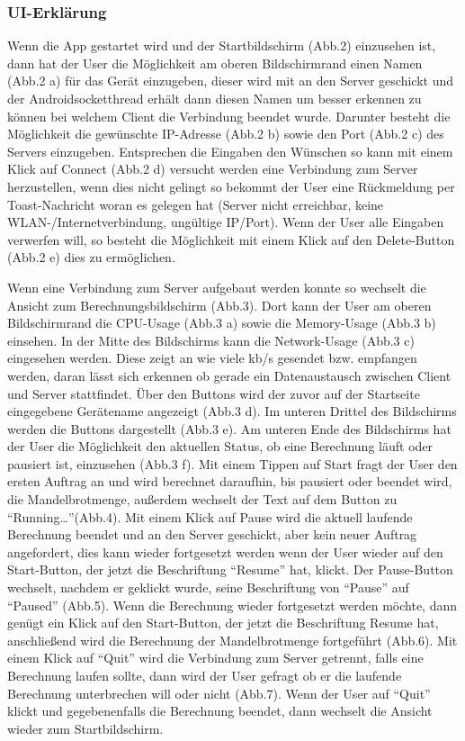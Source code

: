 \documentclass[12pt, onecolumn, notitlepage]{scrartcl}
\begin{document}
\subsubsection{UI-Erklärung}
Wenn die App gestartet wird und der Startbildschirm (Abb.2) einzusehen ist, dann hat der User die Möglichkeit am oberen Bildschirmrand einen Namen (Abb.2 a) für das Gerät einzugeben, dieser wird mit an den Server geschickt und der Androidsocketthread erhält dann diesen Namen um besser erkennen zu können bei welchem Client die Verbindung beendet wurde. Darunter besteht die Möglichkeit die gewünschte IP-Adresse (Abb.2 b) sowie den Port (Abb.2 c) des Servers einzugeben. Entsprechen die Eingaben den Wünschen so kann mit einem Klick auf Connect (Abb.2 d) versucht werden eine Verbindung zum Server herzustellen, wenn dies nicht gelingt so bekommt der User eine Rückmeldung per Toast-Nachricht woran es gelegen hat (Server nicht erreichbar, keine WLAN-/Internetverbindung, ungültige IP/Port). Wenn der User alle Eingaben verwerfen will, so besteht die Möglichkeit mit einem Klick auf den Delete-Button (Abb.2 e) dies zu ermöglichen. \par
Wenn eine Verbindung zum Server aufgebaut werden konnte so wechselt die Ansicht zum Berechnungsbildschirm (Abb.3). Dort kann der User am oberen Bildschirmrand die CPU-Usage (Abb.3 a) sowie die Memory-Usage (Abb.3 b) einsehen. In der Mitte des Bildschirms kann die Network-Usage (Abb.3 c) eingesehen werden. Diese zeigt an wie viele kb/s gesendet bzw. empfangen werden, daran lässt sich erkennen ob gerade ein Datenaustausch zwischen Client und Server stattfindet. Über den Buttons wird der zuvor auf der Startseite eingegebene Gerätename angezeigt (Abb.3 d). Im unteren Drittel des Bildschirms werden die Buttons dargestellt (Abb.3 e). Am unteren Ende des Bildschirms hat der User die Möglichkeit den aktuellen Status, ob eine Berechnung läuft oder pausiert ist, einzusehen (Abb.3 f). Mit einem Tippen auf Start fragt der User den ersten Auftrag an und wird berechnet daraufhin, bis pausiert oder beendet wird, die Mandelbrotmenge, außerdem wechselt der Text auf dem Button zu \enquote{Running…}(Abb.4). Mit einem Klick auf Pause wird die aktuell laufende Berechnung beendet und an den Server geschickt, aber kein neuer Auftrag angefordert, dies kann wieder fortgesetzt werden wenn der User wieder auf den Start-Button, der jetzt die Beschriftung \enquote{Resume} hat, klickt. Der Pause-Button wechselt, nachdem er geklickt wurde, seine Beschriftung von \enquote{Pause} auf \enquote{Paused} (Abb.5). Wenn die Berechnung wieder fortgesetzt werden möchte, dann genügt ein Klick auf den Start-Button, der jetzt die Beschriftung Resume hat, anschließend wird die Berechnung der Mandelbrotmenge fortgeführt (Abb.6). Mit einem Klick auf \enquote{Quit} wird die Verbindung zum Server getrennt, falls eine Berechnung laufen sollte, dann wird der User gefragt ob er die laufende Berechnung unterbrechen will oder nicht (Abb.7). Wenn der User auf \enquote{Quit} klickt und gegebenenfalls die Berechnung beendet, dann wechselt die Ansicht wieder zum Startbildschirm. \\ \\
\end{document}
